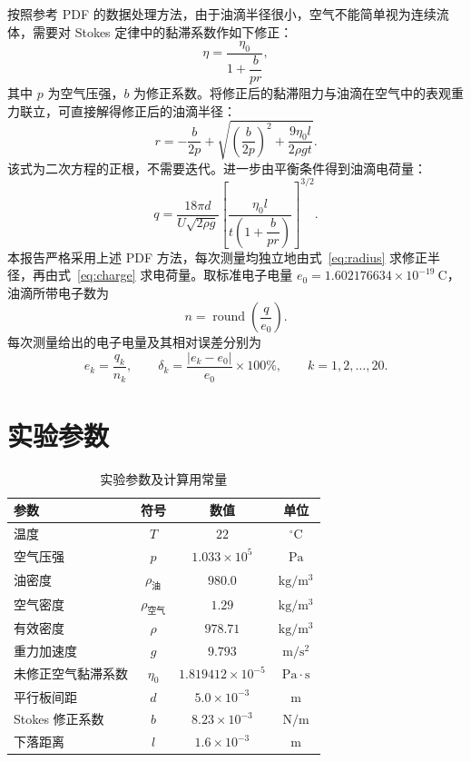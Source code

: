 \documentclass[UTF8,a4paper,12pt]{ctexart}
\begin{document}
按照参考 PDF 的数据处理方法，由于油滴半径很小，空气不能简单视为连续流体，需要对 Stokes 定律中的黏滞系数作如下修正：
\begin{equation}
  \eta=\frac{\eta_0}{1+\dfrac{b}{pr}},
\end{equation}
其中 $p$ 为空气压强，$b$ 为修正系数。将修正后的黏滞阻力与油滴在空气中的表观重力联立，可直接解得修正后的油滴半径：
\begin{equation}
  r=-\frac{b}{2p}+
  \sqrt{\left(\frac{b}{2p}\right)^2+\frac{9\eta_0 l}{2\rho gt}}.
  \label{eq:radius}
\end{equation}
该式为二次方程的正根，不需要迭代。进一步由平衡条件得到油滴电荷量：
\begin{equation}
  q=\frac{18\pi d}{U\sqrt{2\rho g}}
  \left[\frac{\eta_0 l}{t\left(1+\dfrac{b}{pr}\right)}\right]^{3/2}.
  \label{eq:charge}
\end{equation}
本报告严格采用上述 PDF 方法，每次测量均独立地由式~\eqref{eq:radius} 求修正半径，再由式~\eqref{eq:charge} 求电荷量。取标准电子电量 $e_0=1.602176634\times10^{-19}\ \mathrm{C}$，油滴所带电子数为
\begin{equation}
  n=\operatorname{round}\left(\frac{q}{e_0}\right).
\end{equation}
每次测量给出的电子电量及其相对误差分别为
\begin{equation}
  e_k=\frac{q_k}{n_k},\qquad
  \delta_k=\frac{|e_k-e_0|}{e_0}\times100\%,\qquad k=1,2,\ldots,20.
\end{equation}

\section{实验参数}
\begin{table}[htbp]
  \centering
  \caption{实验参数及计算用常量}
  \begin{tabular}{>{\centering\arraybackslash}p{4.2cm}ccc}
    \toprule
    参数 & 符号 & 数值 & 单位 \\
    \midrule
    温度 & $T$ & $22$ & $^\circ\mathrm{C}$ \\
    空气压强 & $p$ & $1.033\times10^5$ & $\mathrm{Pa}$ \\
    油密度 & $\rho_{\text{油}}$ & $980.0$ & $\mathrm{kg/m^3}$ \\
    空气密度 & $\rho_{\text{空气}}$ & $1.29$ & $\mathrm{kg/m^3}$ \\
    有效密度 & $\rho$ & $978.71$ & $\mathrm{kg/m^3}$ \\
    重力加速度 & $g$ & $9.793$ & $\mathrm{m/s^2}$ \\
    未修正空气黏滞系数 & $\eta_0$ & $1.819412\times10^{-5}$ & $\mathrm{Pa\cdot s}$ \\
    平行板间距 & $d$ & $5.0\times10^{-3}$ & $\mathrm{m}$ \\
    Stokes 修正系数 & $b$ & $8.23\times10^{-3}$ & $\mathrm{N/m}$ \\
    下落距离 & $l$ & $1.6\times10^{-3}$ & $\mathrm{m}$ \\
    \bottomrule
  \end{tabular}
\end{table}
\end{document}
